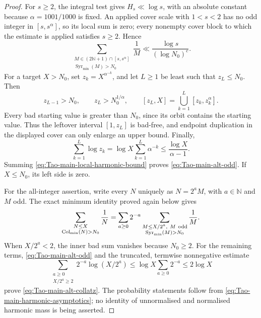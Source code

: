 \begin{proof}
For \(s\geq2\), the integral test gives \(H_s\ll\log s\), with an
absolute constant because \(\alpha=1001/1000\) is fixed.  An applied cover
scale with \(1<s<2\) has no odd integer in \([s,s^\alpha]\), so its local
sum is zero; every nonempty cover block to which the estimate is applied
satisfies \(s\geq2\).  Hence
\begin{equation}
\label{eq:Tao-main-local-harmonic-bound}
 \sum_{\substack{M\in(2\mathbb N+1)\cap[s,s^\alpha]\\
          \operatorname{Syr}_{\min}(M)>N_0}}
          \frac1M
 \ll\frac{\log s}{(\log N_0)^c}.
\end{equation}
For a target \(X>N_0\), set
\(z_k=X^{\alpha^{-k}}\), and let \(L\geq1\) be least such that
\(z_L\leq N_0\).  Then
\[
 z_{L-1}>N_0,
 \qquad z_L>N_0^{1/\alpha},
 \qquad
 [z_L,X]=\bigcup_{k=1}^L[z_k,z_k^\alpha].
\]
Every bad starting value is greater than \(N_0\), since its orbit contains
the starting value.  Thus the leftover interval \([1,z_L]\) is bad-free,
and endpoint duplication in the displayed cover can only enlarge an upper
bound.  Finally,
\begin{equation}
\label{eq:Tao-main-cover-log-sum}
 \sum_{k=1}^L\log z_k
 =\log X\sum_{k=1}^L\alpha^{-k}
 \leq\frac{\log X}{\alpha-1}.
\end{equation}
Summing \eqref{eq:Tao-main-local-harmonic-bound} proves
\eqref{eq:Tao-main-alt-odd}.  If \(X\leq N_0\), its left side is zero.

For the all-integer assertion, write every \(N\) uniquely as
\(N=2^aM\), with \(a\in\mathbb N\) and \(M\) odd.  The exact minimum
identity proved again below gives
\begin{equation}
\label{eq:Tao-main-fixed-dyadic-sum}
 \sum_{\substack{N\leq X\\
       \operatorname{Col}_{\min}(N)>N_0}}\frac1N
 =\sum_{a\geq0}2^{-a}
  \sum_{\substack{M\leq X/2^a,\ M\ {\rm odd}\\
       \operatorname{Syr}_{\min}(M)>N_0}}\frac1M.
\end{equation}
When \(X/2^a<2\), the inner bad sum vanishes because \(N_0\geq2\).
For the remaining terms, \eqref{eq:Tao-main-alt-odd} and the truncated,
termwise nonnegative estimate
\[
 \sum_{\substack{a\geq0\\X/2^a\geq2}}
     2^{-a}\log(X/2^a)
 \leq \log X\sum_{a\geq0}2^{-a}
 \leq2\log X
\]
prove \eqref{eq:Tao-main-alt-collatz}.  The probability statements follow
from \eqref{eq:Tao-main-harmonic-asymptotics}; no identity of unnormalised
and normalised harmonic mass is being asserted.
\end{proof}


